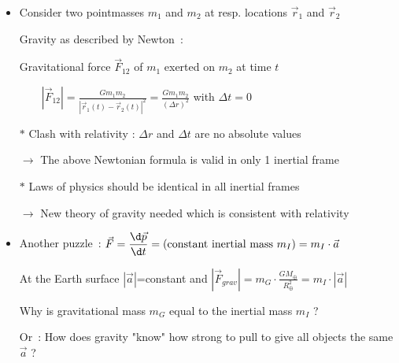 \onecolumn
\begin{itemize}
\item Consider two pointmasses $m_{1}$ and $m_{2}$ at resp. locations $\vec{r}_{1}$ and $\vec{r}_{2}$
\item[] Gravity as described by Newton~:
\item[] Gravitational force $\vec{F}_{12}$ of $m_{1}$ exerted on $m_{2}$ at time $t$
\item[] $\displaystyle \qquad |\vec{F}_{12}|=\frac{Gm_{1}m_{2}}{|\vec{r}_{1}(t)-\vec{r}_{2}(t)|^{2}}
        =\frac{Gm_{1}m_{2}}{(\Delta r)^{2}}$ with $\Delta t=0$
\item[$\ast$] {\blue Clash with relativity} : $\Delta r$ and $\Delta t$ are no absolute values
\item[] $\rightarrow$ The above Newtonian formula is valid in only 1 inertial frame
\item[$\ast$] {\red Laws of physics should be identical in all inertial frames}
\item[] $\rightarrow$ {\blue New theory of gravity needed which is consistent with relativity}
\item Another puzzle~: $\displaystyle \vec{F}=\frac{\d\vec{p}}{\d t}=(\text{constant inertial mass}~m_{I})
                        =m_{I} \cdot \vec{a}$
\item[] At the Earth surface $|\vec{a}|$=constant and
        $|\vec{F}_{grav}|=m_{G}\cdot\frac{GM_{\oplus}}{R_{\oplus}^{2}}=m_{I}\cdot|\vec{a}|$
\item[] Why is {\blue gravitational mass $m_{G}$} equal to the {\blue inertial mass $m_{I}$} ?
\item[] Or~: How does gravity "know" how strong to pull to give all objects the same $\vec{a}$ ? 
\end{itemize}
